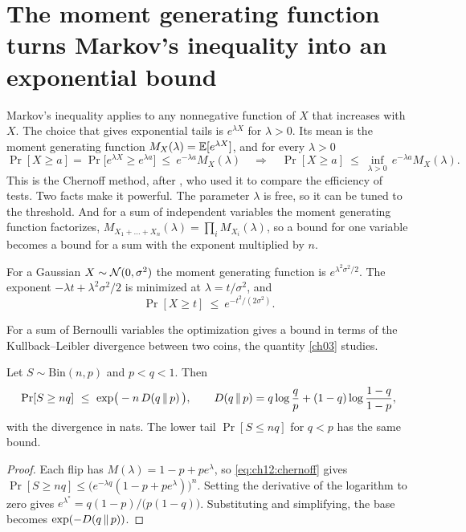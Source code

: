 
\section{The moment generating function turns Markov's inequality into an exponential bound}\label{sec:ch12:chernoff}

Markov's inequality applies to any nonnegative function of $X$ that increases with $X$. The choice that gives exponential tails is $e^{\lambda X}$ for $\lambda>0$. Its mean is the moment generating function $M_X(\lambda)=\mathbb{E}[e^{\lambda X}]$, and for every $\lambda>0$
\begin{equation}
\Pr[X\ge a]=\Pr\big[e^{\lambda X}\ge e^{\lambda a}\big]\ \le\ e^{-\lambda a}M_X(\lambda)
\quad\Longrightarrow\quad
\Pr[X\ge a]\ \le\ \inf_{\lambda>0}\,e^{-\lambda a}M_X(\lambda).
\label{eq:ch12:chernoff}
\end{equation}
This is the Chernoff method, after \citet{chernoff1952}, who used it to compare the efficiency of tests. Two facts make it powerful. The parameter $\lambda$ is free, so it can be tuned to the threshold. And for a sum of independent variables the moment generating function factorizes, $M_{X_1+\dots+X_n}(\lambda)=\prod_i M_{X_i}(\lambda)$, so a bound for one variable becomes a bound for a sum with the exponent multiplied by $n$.

For a Gaussian $X\sim\mathcal{N}(0,\sigma^2)$ the moment generating function is $e^{\lambda^2\sigma^2/2}$. The exponent $-\lambda t+\lambda^2\sigma^2/2$ is minimized at $\lambda=t/\sigma^2$, and
\begin{equation}
\Pr[X\ge t]\ \le\ e^{-t^2/(2\sigma^2)}.
\label{eq:ch12:gauss-chernoff}
\end{equation}

For a sum of Bernoulli variables the optimization gives a bound in terms of the Kullback--Leibler divergence between two coins, the quantity \cref{ch03} studies.
\begin{theorem}\label{thm:ch12:chernoff-kl}
Let $S\sim\mathrm{Bin}(n,p)$ and $p<q<1$. Then
\begin{equation}
\Pr[S\ge nq]\ \le\ \exp\!\big(-n\,\KL{q}{p}\big),
\qquad
\KL{q}{p}=q\log\frac qp+(1-q)\log\frac{1-q}{1-p},
\label{eq:ch12:chernoff-kl}
\end{equation}
with the divergence in nats. The lower tail $\Pr[S\le nq]$ for $q<p$ has the same bound.
\end{theorem}
\begin{proof}
Each flip has $M(\lambda)=1-p+pe^\lambda$, so \cref{eq:ch12:chernoff} gives $\Pr[S\ge nq]\le\big(e^{-\lambda q}(1-p+pe^\lambda)\big)^n$. Setting the derivative of the logarithm to zero gives $e^{\lambda^*}=q(1-p)/\big(p(1-q)\big)$. Substituting and simplifying, the base becomes $\exp(-D\!\left(q\,\middle\|\,p\right))$.
\end{proof}

